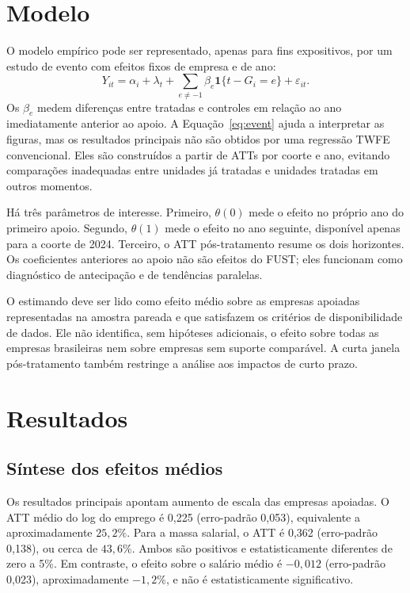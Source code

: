 \documentclass[12pt,a4paper]{article}
\newcommand{\pct}[1]{\ensuremath{#1\%}}
\begin{document}
\section{Modelo}

O modelo empírico pode ser representado, apenas para fins expositivos, por um estudo de evento
com efeitos fixos de empresa e de ano:
\begin{equation}
  Y_{it}=\alpha_i+\lambda_t+\sum_{e\neq-1}\beta_e
  \mathbf{1}\{t-G_i=e\}+\varepsilon_{it}.
  \label{eq:event}
\end{equation}
Os $\beta_e$ medem diferenças entre tratadas e controles em relação ao ano imediatamente anterior
ao apoio. A Equação~\eqref{eq:event} ajuda a interpretar as figuras, mas os resultados principais
não são obtidos por uma regressão TWFE convencional. Eles são construídos a partir de ATTs por
coorte e ano, evitando comparações inadequadas entre unidades já tratadas e unidades tratadas em
outros momentos.

Há três parâmetros de interesse. Primeiro, $\theta(0)$ mede o efeito no próprio ano do primeiro
apoio. Segundo, $\theta(1)$ mede o efeito no ano seguinte, disponível apenas para a coorte de
2024. Terceiro, o ATT pós-tratamento resume os dois horizontes. Os coeficientes anteriores ao
apoio não são efeitos do FUST; eles funcionam como diagnóstico de antecipação e de tendências
paralelas.

O estimando deve ser lido como efeito médio sobre as empresas apoiadas representadas na amostra
pareada e que satisfazem os critérios de disponibilidade de dados. Ele não identifica, sem
hipóteses adicionais, o efeito sobre todas as empresas brasileiras nem sobre empresas sem suporte
comparável. A curta janela pós-tratamento também restringe a análise aos impactos de curto prazo.

\section{Resultados}

\subsection{Síntese dos efeitos médios}

Os resultados principais apontam aumento de escala das empresas apoiadas. O ATT médio do log do
emprego é 0,225 (erro-padrão 0,053), equivalente a aproximadamente \pct{25,2}. Para a massa
salarial, o ATT é 0,362 (erro-padrão 0,138), ou cerca de \pct{43,6}. Ambos são positivos e
estatisticamente diferentes de zero a 5\%. Em contraste, o efeito sobre o salário médio é
$-0,012$ (erro-padrão 0,023), aproximadamente $-1,2\%$, e não é estatisticamente significativo.
\end{document}
